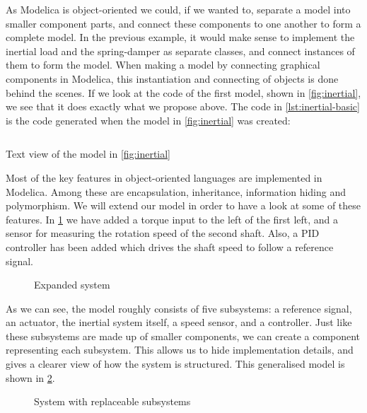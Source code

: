 \documentclass[\rootfolder/main.tex]{subfiles}
\begin{document}
As Modelica is object-oriented we could, if we wanted to, separate a model into smaller component parts, and connect these components to one another to form a complete model.
In the previous example, it would make sense to implement the inertial load and the spring-damper as separate classes, and connect instances of them to form the model.
When making a model by connecting graphical components in Modelica, this instantiation and connecting of objects is done behind the scenes.
If we look at the code of the first model, shown in \cref{fig:inertial}, we see that it does exactly what we propose above.
The code in \cref{lst:inertial-basic} is the code generated when the model in \cref{fig:inertial} was created\footnotemark:


\begin{listing}[ht]
    \inputminted[fontsize=\footnotesize]{Modelica}{\rootfolder/Models/MasterProject/Models/InertialBasic2.mo}
    \caption{Text view of the model in \cref{fig:inertial}}
    \label{lst:inertial-basic}
\end{listing}

Most of the key features in object-oriented languages are implemented in Modelica.
Among these are encapsulation, inheritance, information hiding and polymorphism.
We will extend our model in order to have a look at some of these features.
In \cref{fig:inertial-expanded} we have added a torque input to the left of the first left, and a sensor for measuring the rotation speed of the second shaft.
Also, a PID controller has been added which drives the shaft speed to follow a reference signal.

\begin{figure}[ht]
    \caption{Expanded system}
    \label{fig:inertial-expanded}
\end{figure}

As we can see, the model roughly consists of five subsystems: a reference signal, an actuator, the inertial system itself, a speed sensor, and a controller.
Just like these subsystems are made up of smaller components, we can create a component representing each subsystem.
This allows us to hide implementation details, and gives a clearer view of how the system is structured.
This generalised model is shown in \cref{fig:inertial-architecture}.

\begin{figure}[ht]
    \caption{System with replaceable subsystems}
    \label{fig:inertial-architecture}
\end{figure}
\end{document}
